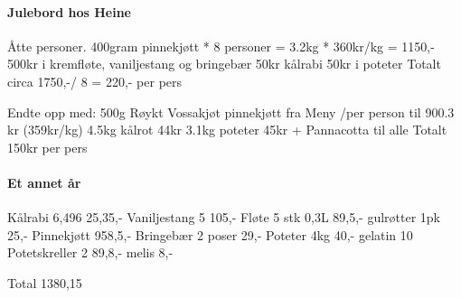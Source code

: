 \paragraph{Julebord hos Heine}
Åtte personer.
400gram pinnekjøtt * 8 personer = 3.2kg * 360kr/kg = 1150,-
500kr i kremfløte, vaniljestang og bringebær
50kr kålrabi
50kr i poteter
Totalt circa 1750,-/ 8 = 220,- per pers


Endte opp med:
500g Røykt Vossakjøt pinnekjøtt fra Meny /per person til 900.3 kr (359kr/kg)
4.5kg kålrot 44kr
3.1kg poteter 45kr
+ Pannacotta til alle
Totalt 150kr per pers


\paragraph{Et annet år}

Kålrabi 6,496 25,35,-
Vaniljestang 5 105,-
Fløte 5 stk 0,3L 89,5,-
gulrøtter 1pk 25,-
Pinnekjøtt 958,5,-
Bringebær 2 poser 29,-
Poteter 4kg 40,-
gelatin 10
Potetskreller 2 89,8,-
melis 8,-


Total
1380,15
